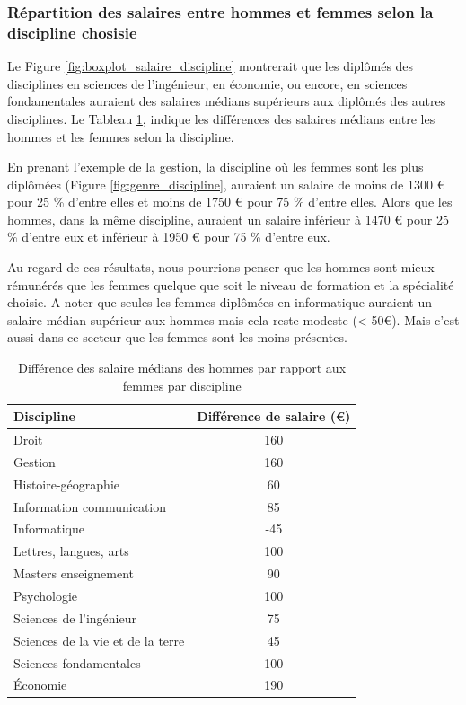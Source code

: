\documentclass[12pt, a4paper, titlepage, table]{article}
\begin{document}
	\subsubsection{Répartition des salaires entre hommes et femmes selon la discipline chosisie}

	Le Figure \ref{fig:boxplot_salaire_discipline} montrerait que les diplômés des disciplines en sciences de l'ingénieur, en économie, ou encore, en sciences fondamentales auraient des salaires médians supérieurs aux diplômés des autres disciplines. Le Tableau \ref{tab:diff_salaire_genre}, indique les différences des salaires médians entre les hommes et les femmes selon la discipline.
	
	En prenant l'exemple de la gestion, la discipline où les femmes sont les plus diplômées (Figure \ref{fig:genre_discipline}, auraient un salaire de moins de 1300 € pour 25 \% d'entre elles et moins de 1750 € pour 75 \% d'entre elles.
	Alors que les hommes, dans la même discipline, auraient un salaire inférieur à 1470 € pour  25 \% d'entre eux et inférieur à 1950 € pour 75 \% d'entre eux. 
	
	Au regard de ces résultats, nous pourrions penser que les hommes sont mieux rémunérés que les femmes quelque que soit le niveau de formation et la spécialité choisie. A noter que seules les femmes diplômées en informatique auraient un salaire médian supérieur aux hommes mais cela reste modeste (< 50€). Mais c'est aussi dans ce secteur que les femmes sont les moins présentes.
	
	\begin{table}[H]
		\centering
		\begin{tabular}{lc}
			\toprule
			\textbf{Discipline} & \textbf{Différence de salaire (€)} \\
			\midrule
			Droit & 160 \\
			Gestion & 160 \\
			Histoire-géographie & 60 \\
			Information communication & 85 \\
			Informatique & -45 \\
			Lettres, langues, arts & 100 \\
			Masters enseignement & 90 \\
			Psychologie & 100 \\
			Sciences de l'ingénieur & 75 \\
			Sciences de la vie et de la terre & 45 \\
			Sciences fondamentales & 100 \\
			Économie & 190 \\
			\bottomrule
		\end{tabular}
		\caption{Différence des salaire médians des hommes par rapport aux femmes par discipline}
		\label{tab:diff_salaire_genre}
	\end{table}
\end{document}
